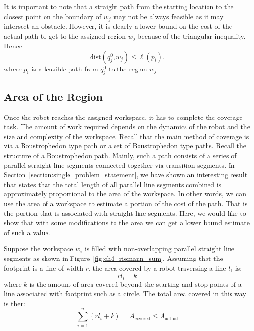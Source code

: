 \documentclass[../main.tex]{subfiles}
\begin{document}
It is important to note that a straight path from the starting location to the closest point on the boundary of $w_j$ may not be always feasible as it may intersect an obstacle. However, it is clearly a lower bound on the cost of the actual path to get to the assigned region $w_j$ because of the triangular inequality. Hence,
\begin{equation}
	\text{dist}(q^0_j,w_j)\leq\ell(p_i).
\end{equation}
where $p_i$ is a feasible path from $q^0_j$ to the region $w_j$.


\subsection{Area of the Region}

Once the robot reaches the assigned workspace, it has to complete the coverage task. The amount of work required depends on the dynamics of the robot and the size and complexity of the workspace. Recall that the main method of coverage is via a Boustrophedon type path or a set of Boustrophedon type paths. Recall the structure of a Boustrophedon path. Mainly, such a path consists of a series of parallel straight line segments connected together via transition segments. In Section~\ref{section:single_problem_statement}, we have shown an interesting result that states that the total length of all parallel line segments combined is approximately proportional to the area of the workspace. In other words, we can use the area of a workspace to estimate a portion of the cost of the path. That is the portion that is associated with straight line segments. Here, we would like to show that with some modifications to the area we can get a lower bound estimate of such a value.


Suppose the workspace $w_i$ is filled with non-overlapping parallel straight line segments as shown in Figure~\ref{fig:ch4_riemann_sum}. Assuming that the footprint is a line of width $r$, the area covered by a robot traversing a line $l_1$ is:
\begin{equation}
	rl_i+k
\end{equation}
where $k$ is the amount of area covered beyond the starting and stop points of a line associated with footprint such as a circle. The total area covered in this way is then:
\begin{equation}
	\sum_{i=1}^n(rl_i+k)=A_{\text{covered}}\leq A_{\text{actual}}
\end{equation}
\end{document}
